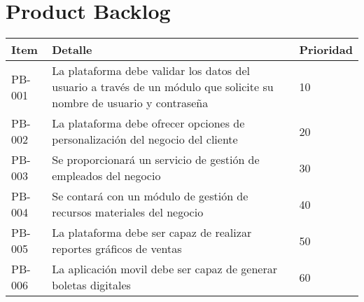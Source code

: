 \chapter{Product Backlog}

\begin{table}[htbp]
	\begin{center}
		\begin{tabular}{|p{1.5cm} | p{12cm} | p{2cm} |}
			\hline
			Item & Detalle & Prioridad \\
			\hline
			PB-001 & La plataforma debe validar los datos del usuario a través de un módulo que solicite su nombre de usuario y contraseña & 10 \\
			\hline
			PB-002 & La plataforma debe ofrecer opciones de personalización del negocio del cliente & 20  \\
			\hline
			PB-003 & Se proporcionará un servicio de gestión de empleados del negocio & 30  \\
			\hline
			PB-004 & Se contará con un módulo de gestión de recursos materiales del negocio & 40 \\
			\hline	
			PB-005 & La plataforma debe ser capaz de realizar reportes gráficos de ventas & 50 \\
			\hline
			PB-006 & La aplicación movil debe ser capaz de generar boletas digitales & 60 \\
			\hline
		\end{tabular}
	\end{center}
\end{table}
